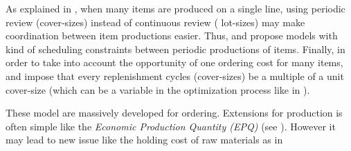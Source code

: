 As explained in \cite{Eynan2007}, when many items are produced on a single line, using periodic review (\ie cover-sizes) instead of continuous review (\ie {} lot-sizes) may make coordination between item productions easier.
Thus, \cite{Madigan1968} and \cite{Chiu2014} propose models with kind of scheduling constraints between periodic productions of items.
Finally, in order to take into account the opportunity of one ordering cost for many items, \cite{Bomberger1966} and \cite{Goyal1974} impose that every replenishment cycles (cover-sizes) be a multiple of a unit cover-size (which can be a variable in the optimization process like in \cite{Silver1976}).


\medskip


These model are massively developed for ordering.
Extensions for production is often simple like the \emph{Economic Production Quantity (EPQ)} (see \cite{Taft1918}).
However it may lead to new issue like the holding cost of raw materials as in \cite{Lin2013}









